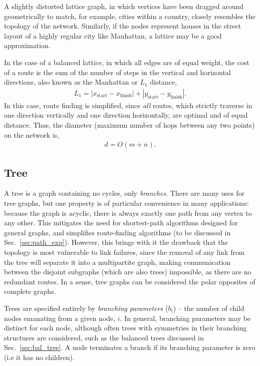 A slightly distorted lattice graph, in which vertices have been dragged around geometrically to match, for example, cities within a country, closely resembles the topology of the network. Similarly, if the nodes represent houses in the street layout of a highly regular city like Manhattan, a lattice may be a good approximation.

In the case of a balanced lattice, in which all edges are of equal weight, the cost of a route is the sum of the number of steps in the vertical and horizontal directions, also known as the Manhattan or $L_1$ distance,
\begin{align}
L_1 = |x_\mathrm{start} - x_\mathrm{finish}| + |y_\mathrm{start} - y_\mathrm{finish}|.
\end{align}
In this case, route finding is simplified, since \textit{all} routes, which strictly traverse in one direction vertically and one direction horizontally, are optimal and of equal distance. Thus, the diameter (maximum number of hops between any two points) on the network is,
\begin{align}
	d=O(m+n).
\end{align}

%
%

\subsection{Tree} \label{sec:tree_graph} 

A tree is a graph containing no cycles, only \textit{branches}. There are many uses for tree graphs, but one property is of particular convenience in many applications: because the graph is acyclic, there is always exactly one path from any vertex to any other. This mitigates the need for shortest-path algorithms designed for general graphs, and simplifies route-finding algorithms (to be discussed in Sec.~\ref{sec:path_exp}). However, this brings with it the drawback that the topology is most vulnerable to link failures, since the removal of any link from the tree will separate it into a multipartite graph, making communication between the disjoint subgraphs (which are also trees) impossible, as there are no redundant routes. In a sense, tree graphs can be considered the polar opposites of complete graphs.

Trees are specified entirely by \textit{branching parameters} ($b_i$) -- the number of child nodes emanating from a given node, $i$. In general, branching parameters may be distinct for each node, although often trees with symmetries in their branching structures are considered, such as the balanced trees discussed in Sec.~\ref{sec:bal_tree}. A node terminates a branch if its branching parameter is zero (i.e it has no children).

